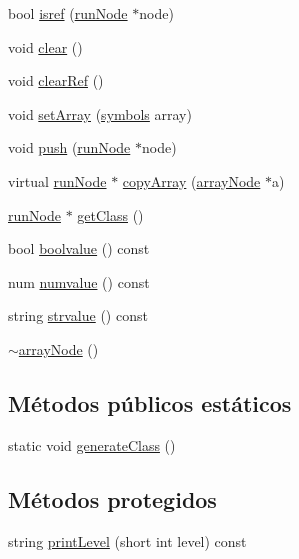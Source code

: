\begin{DoxyCompactItemize}
\item 
bool \hyperlink{classarrayNode_a9e58c867215bef0ab3dfd4db78d6b2f2}{isref} (\hyperlink{classrunNode}{run\-Node} $\ast$node)
\item 
void \hyperlink{classarrayNode_a8e37cc53c47cf7c264757e25d50af586}{clear} ()
\item 
void \hyperlink{classarrayNode_a907ba507d3fa9e402499dfb13cfec835}{clear\-Ref} ()
\item 
void \hyperlink{classarrayNode_ac478825dc6f392ed96fc81cbc61758ca}{set\-Array} (\hyperlink{classsymbolsTable}{symbols} array)
\item 
void \hyperlink{classarrayNode_a88cd3c520d82d253fee5d7b5f5c857f9}{push} (\hyperlink{classrunNode}{run\-Node} $\ast$node)
\item 
virtual \hyperlink{classrunNode}{run\-Node} $\ast$ \hyperlink{classarrayNode_aa2a23e8d7e23dfc039ecdd17badf2324}{copy\-Array} (\hyperlink{classarrayNode}{array\-Node} $\ast$a)
\item 
\hyperlink{classrunNode}{run\-Node} $\ast$ \hyperlink{classarrayNode_adb8aba7525e34c7aec375f58be182bd8}{get\-Class} ()
\item 
bool \hyperlink{classarrayNode_af18a8d4f5e369713a01387bad022db72}{boolvalue} () const 
\item 
num \hyperlink{classarrayNode_a8a862493dfcab500edd9acf4f4c55348}{numvalue} () const 
\item 
string \hyperlink{classarrayNode_a3e5771d0cf67476bfe19683d504327d1}{strvalue} () const 
\item 
\hyperlink{classarrayNode_a9076d616c925d5b6dfee1164279f3763}{$\sim$array\-Node} ()
\end{DoxyCompactItemize}
\subsection*{Métodos públicos estáticos}
\begin{DoxyCompactItemize}
\item 
static void \hyperlink{classarrayNode_a4e87dab3b6a894b583aa47199bf64741}{generate\-Class} ()
\end{DoxyCompactItemize}
\subsection*{Métodos protegidos}
\begin{DoxyCompactItemize}
\item 
string \hyperlink{classarrayNode_aedc687b42ca8accbc226bce834a7a7d5}{print\-Level} (short int level) const 
\end{DoxyCompactItemize}


